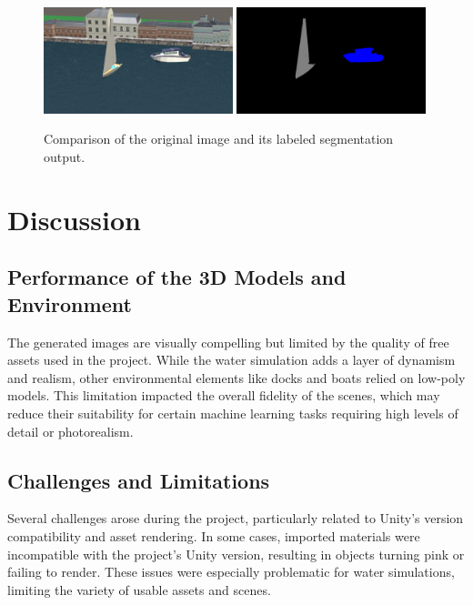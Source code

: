 \begin{figure}[H]
\centering
\includegraphics[width=0.49\textwidth]{Figures/rgb_2.png}
\includegraphics[width=0.49\textwidth]{Figures/segmentation_2.png}
\caption{Comparison of the original image and its labeled segmentation output.}
\label{fig:labeled_images}
\end{figure}

\section{Discussion}
\subsection{Performance of the 3D Models and Environment}
The generated images are visually compelling but limited by the quality of free assets used in the project. While the water simulation adds a layer of dynamism and realism, other environmental elements like docks and boats relied on low-poly models. This limitation impacted the overall fidelity of the scenes, which may reduce their suitability for certain machine learning tasks requiring high levels of detail or photorealism.

\subsection{Challenges and Limitations}
Several challenges arose during the project, particularly related to Unity's version compatibility and asset rendering. In some cases, imported materials were incompatible with the project's Unity version, resulting in objects turning pink or failing to render. These issues were especially problematic for water simulations, limiting the variety of usable assets and scenes.\\

